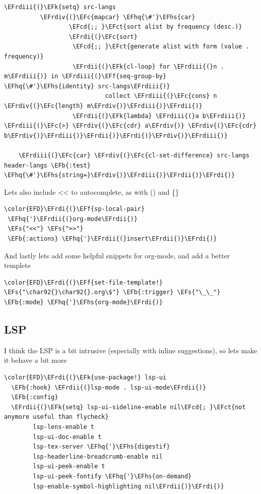\documentclass{scrartcl}
\newcommand{\EFk}[1]{\textcolor{EFk}{#1}} %
\newcommand{\EFs}[1]{\textcolor{EFs}{#1}} %
\newcommand{\EFb}[1]{\textcolor{EFb}{#1}} %
\newcommand{\EFct}[1]{\textcolor{EFct}{#1}} %
\newcommand{\EFc}[1]{\textcolor{EFc}{#1}} %
\newcommand{\EFf}[1]{\textcolor{EFf}{#1}} %
\newcommand{\EFcd}[1]{\textcolor{EFcd}{#1}} %
\newcommand{\EFhq}[1]{\textcolor{EFhq}{#1}} %
\newcommand{\EFhs}[1]{\textcolor{EFhs}{#1}} %
\newcommand{\EFrdi}[1]{\textcolor{EFrdi}{#1}} %
\newcommand{\EFrdii}[1]{\textcolor{EFrdii}{#1}} %
\newcommand{\EFrdiii}[1]{\textcolor{EFrdiii}{#1}} %
\newcommand{\EFrdiv}[1]{\textcolor{EFrdiv}{#1}} %
\begin{document}
\begin{Code}
\begin{Verbatim}[]
    \EFrdiii{(}\EFk{setq} src-langs
          \EFrdiv{(}\EFc{mapcar} \EFhq{\#'}\EFhs{car}
                  \EFcd{;; }\EFct{sort alist by frequency (desc.)}
                  \EFrdi{(}\EFc{sort}
                   \EFcd{;; }\EFct{generate alist with form (value . frequency)}
                   \EFrdii{(}\EFk{cl-loop} for \EFrdiii{(}n . m\EFrdiii{)} in \EFrdiii{(}\EFf{seq-group-by} \EFhq{\#'}\EFhs{identity} src-langs\EFrdiii{)}
                            collect \EFrdiii{(}\EFc{cons} n \EFrdiv{(}\EFc{length} m\EFrdiv{)}\EFrdiii{)}\EFrdii{)}
                   \EFrdii{(}\EFk{lambda} \EFrdiii{(}a b\EFrdiii{)} \EFrdiii{(}\EFc{>} \EFrdiv{(}\EFc{cdr} a\EFrdiv{)} \EFrdiv{(}\EFc{cdr} b\EFrdiv{)}\EFrdiii{)}\EFrdii{)}\EFrdi{)}\EFrdiv{)}\EFrdiii{)}

    \EFrdiii{(}\EFc{car} \EFrdiv{(}\EFc{cl-set-difference} src-langs header-langs \EFb{:test} \EFhq{\#'}\EFhs{string=}\EFrdiv{)}\EFrdiii{)}\EFrdii{)}\EFrdi{)}
\end{Verbatim}
\end{Code}

Lets also include << to autocomplete, as with () and \{\}
\begin{Code}
\begin{Verbatim}[]
\color{EFD}\EFrdi{(}\EFf{sp-local-pair}
 \EFhq{'}\EFrdii{(}org-mode\EFrdii{)}
 \EFs{"<<"} \EFs{">>"}
 \EFb{:actions} \EFhq{'}\EFrdii{(}insert\EFrdii{)}\EFrdi{)}
\end{Verbatim}
\end{Code}

And lastly lets add some helpful snippets for org-mode, and add a better templete
\begin{Code}
\begin{Verbatim}[]
\color{EFD}\EFrdi{(}\EFf{set-file-template!} \EFs{"\char92{}\char92{}.org\$"} \EFb{:trigger} \EFs{"\_\_"} \EFb{:mode} \EFhq{'}\EFhs{org-mode}\EFrdi{)}
\end{Verbatim}
\end{Code}

\subsection{LSP}
\label{sec:org0ef59ea}
I think the LSP is a bit intrusive (especially with inline suggestions), so lets make it behave a bit more
\begin{Code}
\begin{Verbatim}[]
\color{EFD}\EFrdi{(}\EFk{use-package!} lsp-ui
  \EFb{:hook} \EFrdii{(}lsp-mode . lsp-ui-mode\EFrdii{)}
  \EFb{:config}
  \EFrdii{(}\EFk{setq} lsp-ui-sideline-enable nil\EFcd{; }\EFct{not anymore useful than flycheck}
        lsp-lens-enable t
        lsp-ui-doc-enable t
        lsp-tex-server \EFhq{'}\EFhs{digestif}
        lsp-headerline-breadcrumb-enable nil
        lsp-ui-peek-enable t
        lsp-ui-peek-fontify \EFhq{'}\EFhs{on-demand}
        lsp-enable-symbol-highlighting nil\EFrdii{)}\EFrdi{)}
\end{Verbatim}
\end{Code}
\end{document}
